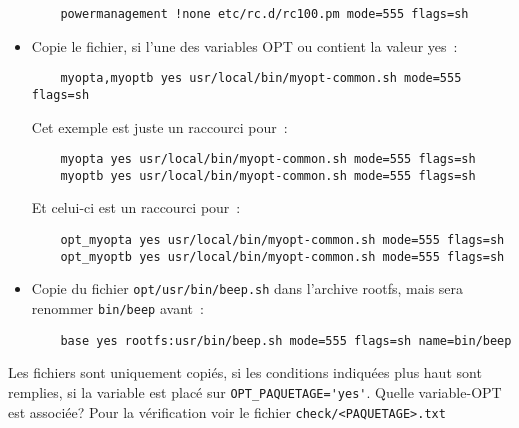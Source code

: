 \begin{itemize}
\begin{example}
\begin{verbatim}
    powermanagement !none etc/rc.d/rc100.pm mode=555 flags=sh
\end{verbatim}
\end{example}

        \item Copie le fichier, si l'une des variables OPT 
        ou  contient la valeur \og{}yes\fg{}~:

\begin{example}
\begin{verbatim}
    myopta,myoptb yes usr/local/bin/myopt-common.sh mode=555 flags=sh
\end{verbatim}
\end{example}

        Cet exemple est juste un raccourci pour~:

\begin{example}
\begin{verbatim}
    myopta yes usr/local/bin/myopt-common.sh mode=555 flags=sh
    myoptb yes usr/local/bin/myopt-common.sh mode=555 flags=sh
\end{verbatim}
\end{example}

        Et celui-ci est un raccourci pour~:

\begin{example}
\begin{verbatim}
    opt_myopta yes usr/local/bin/myopt-common.sh mode=555 flags=sh
    opt_myoptb yes usr/local/bin/myopt-common.sh mode=555 flags=sh
\end{verbatim}
\end{example}

        \item Copie du fichier \texttt{opt/usr/bin/beep.sh} dans l'archive rootfs,
		mais sera  renommer \texttt{bin/beep} avant~:

\begin{example}
\begin{verbatim}
    base yes rootfs:usr/bin/beep.sh mode=555 flags=sh name=bin/beep
\end{verbatim}
\end{example}

    \end{itemize}

    Les fichiers sont uniquement copiés, si les conditions indiquées plus
    haut sont remplies, si la variable est placé sur \verb+OPT_PAQUETAGE='yes'+.
    Quelle variable-OPT est associée? Pour la vérification voir le fichier
    \texttt{check/<PAQUETAGE>.txt}

